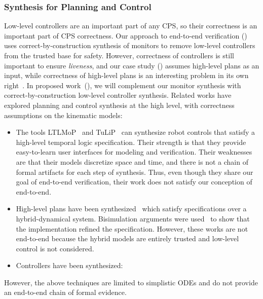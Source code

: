\documentclass[12pt]{cmuthesis}
\theoremstyle{definition}
\theoremstyle{remark}
\newcommand{\rref}[2][]{\prettyref{#2}}
\begin{document}
\subsubsection{Synthesis for Planning and Control}
Low-level controllers are an important part of any CPS, so their correctness is an important part of CPS correctness.
Our approach to end-to-end verification (\rref{sec:veriphy}) uses correct-by-construction synthesis of monitors to remove low-level controllers from the trusted base for safety.
However, correctness of controllers is still important to ensure \emph{liveness}, and our case study (\rref{sec:ground-robotics}) assumes high-level plans as an input, while correctness of high-level plans is an interesting problem in its own right~\cite{DBLP:conf/atva/RizaldiISA18}.
In proposed work~(\rref{ch:proofplex}), we will complement our monitor synthesis with correct-by-construction low-level controller synthesis.
Related works have explored planning and control synthesis at the high level, with correctness assumptions on the kinematic models:
\begin{itemize}
\item The tools LTLMoP~\cite{DBLP:conf/iros/FinucaneJK10} and TuLiP~\cite{DBLP:conf/IEEEcca/FilippidisDLOM16} can synthesize robot controls that satisfy a high-level temporal logic specification.
Their strength is that they provide easy-to-learn user interfaces for modeling and verification.
Their weaknesses are that their models discretize space and time, and there is not a chain of formal artifacts for each step of synthesis.
Thus, even though they share our goal of end-to-end verification, their work does not satisfy our conception of end-to-end.
\item  High-level plans have been synthesized~\cite{DBLP:conf/cdc/BhatiaKV10,DBLP:journals/automatica/FainekosGKP09} which satisfy specifications over a hybrid-dynamical system.
Bisimulation arguments were used~\cite{871304} to show that the implementation refined the specification.
However, these works are not end-to-end because the hybrid models are entirely trusted and low-level control is not considered.
\item Controllers have been synthesized:
\end{itemize}
However, the above techniques are limited to simplistic ODEs and do not provide an end-to-end chain of formal evidence.
\end{document}
